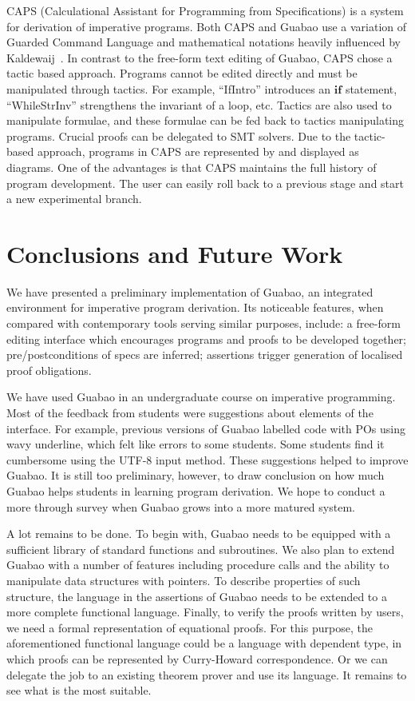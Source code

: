 \documentclass[runningheads]{llncs}
\begin{document}
CAPS (Calculational Assistant for Programming from Specifications) \cite{Chaudhari:14:Automated,Chaudhari:15:Building} is a system for derivation of imperative programs.
Both CAPS and Guabao use a variation of Guarded Command Language and mathematical notations heavily influenced by Kaldewaij~\cite{Kaldewaij:90:Programming}.
In contrast to the free-form text editing of Guabao, CAPS chose a tactic based approach.
Programs cannot be edited directly and must be manipulated through tactics.
For example, ``IfIntro'' introduces an \ensuremath{\mathbf{if}} statement,
``WhileStrInv'' strengthens the invariant of a loop, etc.
Tactics are also used to manipulate formulae, and these formulae can be fed back to tactics manipulating programs.
Crucial proofs can be delegated to SMT solvers.
Due to the tactic-based approach, programs in CAPS are represented by and displayed as diagrams.
One of the advantages is that CAPS maintains the full history of program development.
The user can easily roll back to a previous stage and start a new experimental branch.

\section{Conclusions and Future Work}
\label{sec:conclude}

We have presented a preliminary implementation of Guabao, an integrated environment for imperative program derivation.
Its noticeable features, when compared with contemporary tools serving similar purposes, include: a free-form editing interface which encourages programs and proofs to be developed together; pre/postconditions of specs are inferred; assertions trigger generation of localised proof obligations.

We have used Guabao in an undergraduate course on imperative programming.
Most of the feedback from students were suggestions about elements of the interface.
For example, previous versions of Guabao labelled code with POs using wavy underline, which felt like errors to some students.
Some students find it cumbersome using the UTF-8 input method.
These suggestions helped to improve Guabao.
It is still too preliminary, however, to draw conclusion on how much Guabao helps students in learning program derivation.
We hope to conduct a more through survey when Guabao grows into a more matured system.

A lot remains to be done.
To begin with, Guabao needs to be equipped with a sufficient library of standard functions and subroutines.
We also plan to extend Guabao with a number of features including procedure calls and the ability to manipulate data structures with pointers.
To describe properties of such structure, the language in the assertions of Guabao needs to be extended to a more complete functional language.
Finally, to verify the proofs written by users, we need a formal representation of equational proofs.
For this purpose, the aforementioned functional language could be a language with dependent type, in which proofs can be represented by Curry-Howard correspondence.
Or we can delegate the job to an existing theorem prover and use its language.
It remains to see what is the most suitable.
\end{document}
